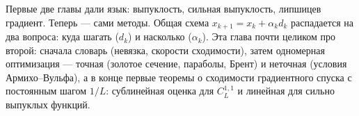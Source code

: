 Первые две главы дали язык: выпуклость, сильная выпуклость, липшицев градиент. Теперь --- сами методы. Общая схема $x_{k+1} = x_k + \alpha_k d_k$ распадается на два вопроса: куда шагать ($d_k$) и насколько ($\alpha_k$). Эта глава почти целиком про второй: сначала словарь (невязка, скорости сходимости), затем одномерная оптимизация --- точная (золотое сечение, параболы, Брент) и неточная (условия Армихо--Вульфа), а в конце первые теоремы о сходимости градиентного спуска с постоянным шагом $1/L$: сублинейная оценка для $C^{1,1}_L$ и линейная для сильно выпуклых функций.
